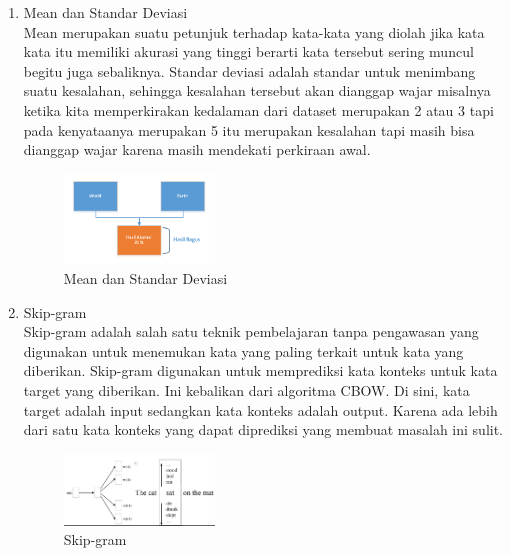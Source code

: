 \begin{enumerate}
\item Mean dan Standar Deviasi\\
Mean merupakan suatu petunjuk terhadap kata-kata yang diolah jika kata kata itu memiliki akurasi yang tinggi berarti kata tersebut sering muncul begitu juga sebaliknya. 
Standar deviasi adalah standar untuk menimbang suatu kesalahan, sehingga kesalahan tersebut akan dianggap wajar misalnya ketika kita memperkirakan kedalaman dari dataset merupakan 2 atau 3 tapi pada kenyataanya merupakan 5 itu merupakan kesalahan tapi masih bisa dianggap wajar karena masih mendekati perkiraan awal.
\hfill\break
	\begin{figure}[H]
		\includegraphics[width=4cm]{figures/1174054/5/5.png}
		\centering
		\caption{Mean dan Standar Deviasi}
	\end{figure}

\item Skip-gram\\
Skip-gram adalah salah satu teknik pembelajaran tanpa pengawasan yang digunakan untuk menemukan kata yang paling terkait untuk kata yang diberikan.
Skip-gram digunakan untuk memprediksi kata konteks untuk kata target yang diberikan. Ini kebalikan dari algoritma CBOW. Di sini, kata target adalah input sedangkan kata konteks adalah output. Karena ada lebih dari satu kata konteks yang dapat diprediksi yang membuat masalah ini sulit.
\hfill\break
	\begin{figure}[H]
		\includegraphics[width=4cm]{figures/1174054/5/6.png}
		\centering
		\caption{Skip-gram}
	\end{figure}

\end{enumerate}

